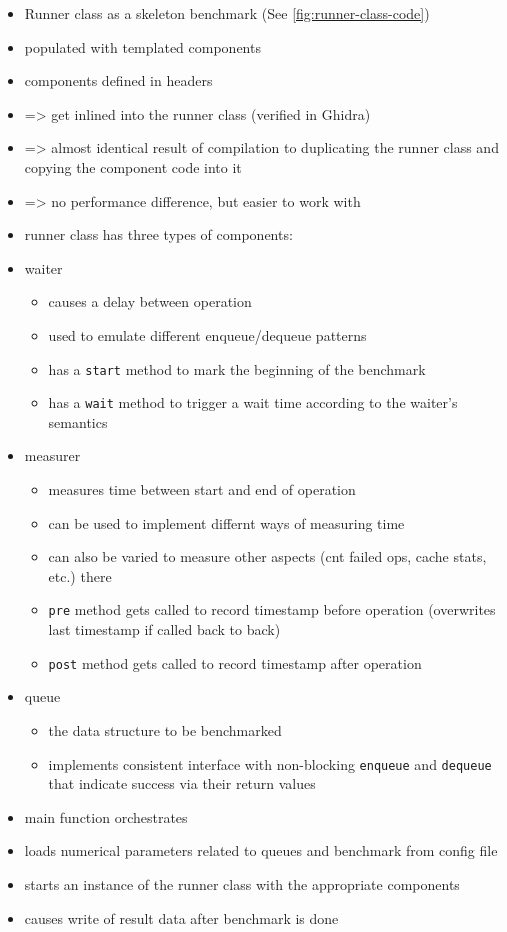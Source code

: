 \begin{itemize}
    \item Runner class as a skeleton benchmark (See \autoref{fig:runner-class-code})
    \item populated with templated components
    \item components defined in headers
    \item => get inlined into the runner class (verified in Ghidra)
    \item => almost identical result of compilation to duplicating the runner class and copying the component
        code into it
    \item => no performance difference, but easier to work with
    \item runner class has three types of components:
    \item waiter
        \begin{itemize}
            \item causes a delay between operation
            \item used to emulate different enqueue/dequeue patterns
            \item has a \texttt{start} method to mark the beginning of the benchmark
            \item has a \texttt{wait} method to trigger a wait time according to the waiter's semantics
        \end{itemize}
    \item measurer
        \begin{itemize}
            \item measures time between start and end of operation
            \item can be used to implement differnt ways of measuring time
            \item can also be varied to measure other aspects (cnt failed ops, cache stats, etc.) there
            \item \texttt{pre} method gets called to record timestamp before operation (overwrites last
                timestamp if called back to back)
            \item \texttt{post} method gets called to record timestamp after operation
        \end{itemize}
    \item queue
        \begin{itemize}
            \item the data structure to be benchmarked
            \item implements consistent interface with non-blocking \texttt{enqueue} and \texttt{dequeue}
                that indicate success via their return values
        \end{itemize}
    \item main function orchestrates
    \item loads numerical parameters related to queues and benchmark from config file
    \item starts an instance of the runner class with the appropriate components
    \item causes write of result data after benchmark is done
\end{itemize}

